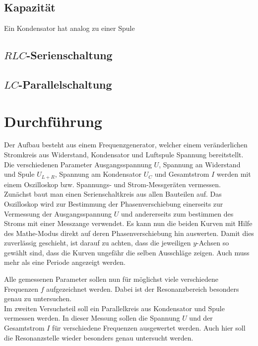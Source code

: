 \documentclass[12pt,a4paper,titlepage,headinclude,bibtotoc]{scrartcl}
\begin{document}
\subsection{Kapazität}
Ein Kondensator hat analog zu einer Spule 


\subsection{$RLC$-Serienschaltung}
\label{sec:RLC}

\subsection{$LC$-Parallelschaltung}
\label{sec:LC}

\section{Durchführung}
\label{sec:durchfuehrung}
Der Aufbau besteht aus einem Frequenzgenerator, welcher einem veränderlichen Stromkreis aus Widerstand, Kondensator und Luftspule Spannung bereitstellt.
Die verschiedenen Parameter Ausgangsspannung $U$, Spannung an Widerstand und Spule $U_{L+R}$, Spannung am Kondensator $U_C$ und Gesamtstrom $I$ werden mit einem Oszilloskop bzw. Spannungs- und Strom-Messgeräten vermessen.\\

Zunächst baut man einen Serienschaltkreis aus allen Bauteilen auf.
Das Oszilloskop wird zur Bestimmung der Phasenverschiebung einerseits zur Vermessung der Ausgangsspannung $U$ und andererseits zum bestimmen des Stroms mit einer Messzange verwendet.
Es kann nun die beiden Kurven mit Hilfe des Mathe-Modus direkt auf deren Phasenverschiebung hin auswerten.
Damit dies zuverlässig geschieht, ist darauf zu achten, dass die jeweiligen $y$-Achsen so gewählt sind, dass die Kurven ungefähr die selben Ausschläge zeigen.
Auch muss mehr als eine Periode angezeigt werden.

Alle gemessenen Parameter sollen nun für möglichst viele verschiedene Frequenzen $f$ aufgezeichnet werden.
Dabei ist der Resonanzbereich besonders genau zu untersuchen.\\

Im zweiten Versuchsteil soll ein Parallelkreis aus Kondensator und Spule vermessen werden.
In dieser Messung sollen die Spannung $U$ und der Gesamtstrom $I$ für verschiedene Frequenzen ausgewertet werden.
Auch hier soll die Resonanzstelle wieder besonders genau untersucht werden.\\
\end{document}
